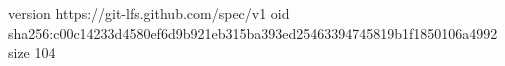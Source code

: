 version https://git-lfs.github.com/spec/v1
oid sha256:c00c14233d4580ef6d9b921eb315ba393ed25463394745819b1f1850106a4992
size 104
